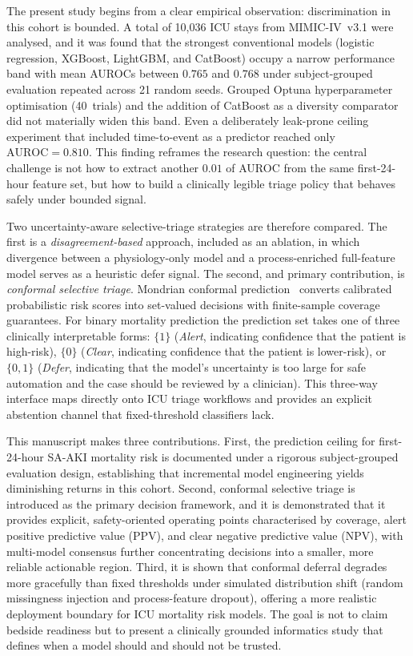 \documentclass[11pt]{article}
\newcommand{\AUROC}{\text{AUROC}}
\begin{document}
The present study begins from a clear empirical observation: discrimination in
this cohort is bounded.  A total of 10,036 ICU stays from MIMIC-IV~v3.1 were analysed, and
it was found that the strongest conventional models (logistic regression, XGBoost,
LightGBM, and CatBoost) occupy a narrow performance band with mean AUROCs
between $0.765$ and $0.768$ under subject-grouped evaluation repeated across 21
random seeds.  Grouped Optuna hyperparameter optimisation (40~trials) and the
addition of CatBoost as a diversity comparator did not materially widen this
band.  Even a deliberately leak-prone ceiling experiment that included
time-to-event as a predictor reached only $\AUROC = 0.810$.  This finding
reframes the research question: the central challenge is not how to extract another
$0.01$ of AUROC from the same first-24-hour feature set, but how to build a
clinically legible triage policy that behaves safely under bounded signal.

Two uncertainty-aware selective-triage strategies are therefore compared.  The
first is a \emph{disagreement-based} approach, included as an ablation, in which
divergence between a physiology-only model and a process-enriched full-feature
model serves as a heuristic defer signal.  The second, and primary contribution,
is \emph{conformal selective triage}.  Mondrian conformal
prediction~\citep{Vovk2005} converts calibrated probabilistic risk scores into
set-valued decisions with finite-sample coverage guarantees.  For binary
mortality prediction the prediction set takes one of three clinically
interpretable forms: $\{1\}$ (\emph{Alert}, indicating confidence that the patient
is high-risk), $\{0\}$ (\emph{Clear}, indicating confidence that the patient is
lower-risk), or $\{0,1\}$ (\emph{Defer}, indicating that the model's uncertainty is too large
for safe automation and the case should be reviewed by a clinician).  This
three-way interface maps directly onto ICU triage workflows and provides an
explicit abstention channel that fixed-threshold classifiers lack.

This manuscript makes three contributions.  First, the prediction
ceiling for first-24-hour SA-AKI mortality risk is documented under a rigorous subject-grouped
evaluation design, establishing that incremental model engineering yields
diminishing returns in this cohort.  Second, conformal selective
triage is introduced as the primary decision framework, and it is demonstrated that it provides
explicit, safety-oriented operating points characterised by coverage, alert
positive predictive value (PPV), and clear negative predictive value (NPV), with
multi-model consensus further concentrating decisions into a smaller, more
reliable actionable region.  Third, it is shown that conformal deferral degrades more
gracefully than fixed thresholds under simulated distribution shift (random
missingness injection and process-feature dropout), offering a more realistic
deployment boundary for ICU mortality risk models.  The goal is not to claim
bedside readiness but to present a clinically grounded informatics study that
defines when a model should and should not be trusted.
\end{document}
